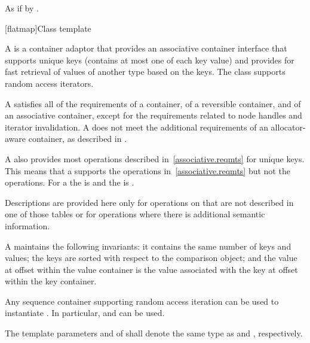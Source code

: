 \begin{codeblock}
\begin{codeblock}
\begin{codeblock}
\begin{itemdescr}
\pnum
\effects As if by .
\end{itemdescr}

\begin{addedblock}
[flatmap]{Class template }

\pnum
{}%
A  is a container adaptor that provides an associative
container interface that supports unique keys (contains at most one of each
key value) and provides for fast retrieval of values of another type 
based on the keys. The  class supports random access
iterators.

\pnum
A  satisfies all of the requirements of a container, of a
reversible container, and of an associative
container, except for the requirements related to
node handles and iterator
invalidation.  A  does not
meet the additional requirements of an allocator-aware container, as described
in .

\pnum
A  also provides most operations described
in~\ref{associative.reqmts} for unique keys.  This means that a
 supports the  operations
in~\ref{associative.reqmts} but not the  operations.  For
a  the  is  and the
 is .

\pnum
Descriptions are provided here only for operations on  that
are not described in one of those tables or for operations where there is
additional semantic information.

\pnum
A  maintains the following invariants: it contains the same
number of keys and values; the keys are sorted with respect to the comparison
object; and the value at offset  within the value container is the
value associated with the key at offset  within the key container.

\pnum
Any sequence container supporting random access iteration can be used to
instantiate . In particular,  and
 can be used.

\pnum
The template parameters  and  of  shall
denote the same type as 
and , respectively.


\end{addedblock}
\end{codeblock}
\end{codeblock}
\end{codeblock}
